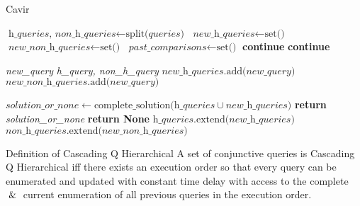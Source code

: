 \documentclass[]{article}
\begin{document}
\begin{algorithm}
	\caption{Cavir}\label{CAVIR}
	\begin{algorithmic}[1]
			\State $\textit{h\_queries, non\_h\_queries} \gets \text{split(}\textit{queries}\text{)}$
			\State $\textit{new\_h\_queries} \gets \text{set()}$
			\State $\textit{new\_non\_h\_queries} \gets \text{set()}$
			\State $\textit{past\_comparisons} \gets \text{set()}$
							\textbf{continue}
						\Else
						\EndIf
							\State \textbf{continue}
						\EndIf
						
									\State \textit{new\_query} \textit{h\_query, non\_h\_query}\text{)}
											\State $\textit{new\_h\_queries}\text{.add(}\textit{new\_query}\text{)}$
									\Else
											\State $\textit{new\_non\_h\_queries}\text{.add(}\textit{new\_query}\text{)}$
									\EndIf
								\EndIf
							\EndIf
						\EndIf
		
					\EndFor
				\EndFor
				\State $\textit{solution\_or\_none} \gets \text{complete\_solution(}\textit{h\_queries} \cup \textit{new\_h\_queries} )$
					\State \textbf{return} \textit{solution\_or\_none}
				\EndIf
					\State	\textbf{return None}
				\EndIf
				\State $\textit{h\_queries}\text{.extend(}\textit{new\_h\_queries})$
				\State $\textit{non\_h\_queries}\text{.extend(}\textit{new\_non\_h\_queries}\text{)}$
			\EndWhile
		\EndFunction
	\end{algorithmic}
\end{algorithm}

\begin{section}{Definition of Cascading Q Hierarchical}
	A set of conjunctive queries is Cascading Q Hierarchical iff there exists an execution order so that every query can be enumerated and updated with constant time delay with access to the complete $\And$ current enumeration of all previous queries in the execution order.
	
\end{section}
\end{document}
